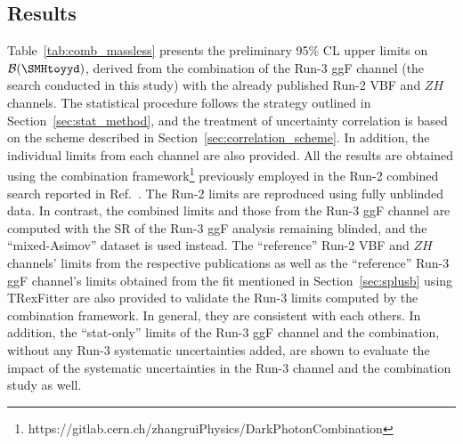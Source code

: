 \subsection{Results}
\label{sec:combinationWithPublishedRun2_results}
Table~\ref{tab:comb_massless} presents the preliminary 95\% CL upper limits on $\mathcal{B}(\SMHtoyyd)$, derived from the combination of the Run-3 ggF channel (the search conducted in this study) with the already published Run-2 VBF and $ZH$ channels.
The statistical procedure follows the strategy outlined in Section~\ref{sec:stat_method}, and the treatment of uncertainty correlation is based on the scheme described in Section~\ref{sec:correlation_scheme}.
In addition, the individual limits from each channel are also provided. 
All the results are obtained using the combination framework\footnote{https://gitlab.cern.ch/zhangruiPhysics/DarkPhotonCombination} previously employed in the Run-2 combined search reported in Ref.~\cite{ATLAS:2024cju}.
The Run-2 limits are reproduced using fully unblinded data.
In contrast, the combined limits and those from the Run-3 ggF channel are computed with the SR of the Run-3 ggF analysis remaining blinded, and the “mixed-Asimov” dataset is used instead.
The ``reference'' Run-2 VBF and $ZH$ channels' limits from the respective publications as well as the ``reference'' Run-3 ggF channel's limits obtained from the fit mentioned in Section~\ref{sec:splusb} using TRexFitter are also provided to validate the Run-3 limits computed by the combination framework.
In general, they are consistent with each others.
In addition, the ``stat-only'' limits of the Run-3 ggF channel and the combination, without any Run-3 systematic uncertainties added, are shown to evaluate the impact of the systematic uncertainties in the Run-3 channel and the combination study as well.
